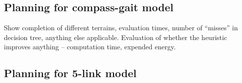 \subsection{Planning for compass-gait model}
Show completion of different terrains, evaluation times, number of ``misses'' in decision tree, anything else applicable. Evaluation of whether the heuristic improves anything -- computation time, expended energy.

\subsection{Planning for 5-link model}